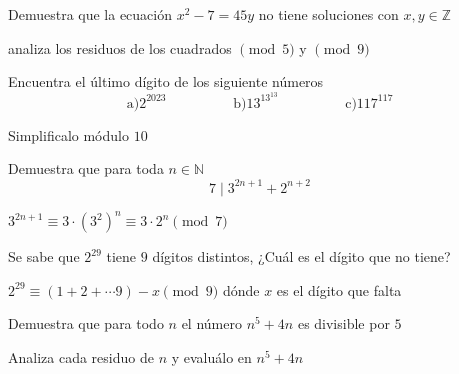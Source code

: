 \documentclass[11pt]{scrartcl}
\begin{document}

\begin{problem}
Demuestra que la ecuación $x^2-7=45y$ no tiene soluciones con $x,y\in \mathbb{Z}$

  \begin{hint}
  analiza los residuos de los cuadrados $\pmod 5$ y $\pmod 9$
  \end{hint}
\end{problem}
\vspace{0.1cm}

\begin{problem}
    Encuentra el último dígito de los siguiente números
       \[\text{a)}2^{2023} \hspace{2cm} \text{b)}13^{13^{13}} \hspace{2cm} \text{c)}117^{117}\]
       \begin{hint}
           Simplificalo módulo $10$
       \end{hint}
\end{problem}
\vspace{0.1cm}
\begin{problem}
    Demuestra que para toda $n\in\mathbb{N}$
    \[7\mid 3^{2n+1}+2^{n+2}\]
    \begin{hint}
        $3^{2n+1}\equiv 3\cdot \left(3^2\right)^{n}\equiv 3\cdot 2^n\pmod 7$
    \end{hint}
\end{problem}
\vspace{0.1cm}
\begin{problem}
    Se sabe que $2^{29}$ tiene $9$ dígitos distintos, ¿Cuál es el dígito que no tiene?
    \begin{hint}
        $2^29\equiv (1+2+\cdots 9)-x\pmod 9$ dónde $x$ es el dígito que falta
    \end{hint}
\end{problem}
\vspace{0.1cm}
\begin{problem}
    Demuestra que para todo $n$ el número $n^5+4n$ es divisible por $5$
\begin{hint}
    Analiza cada residuo de $n$ y evaluálo en $n^5+4n$
\end{hint}
\end{problem}
\vspace{0.1cm}
\end{document}
